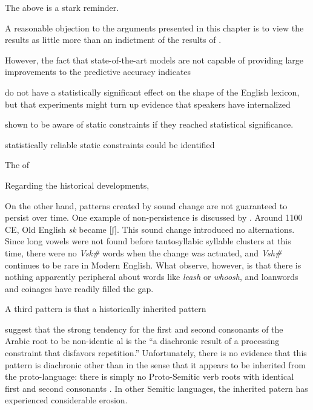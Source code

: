 
The above is a stark reminder.


A reasonable objection to the arguments presented in this chapter is to view the results as little more than an indictment of the results of \citealt{Pierrehumbert1994}.

However, the fact that state-of-the-art models are not capable of providing large improvements to the predictive accuracy indicates


 do not have a statistically significant effect on the shape of the English lexicon, but that experiments might turn up evidence that speakers have internalized 


shown to be aware of static constraints if they reached statistical significance. 



 statistically reliable static constraints could be identified 

The of



Regarding the historical developments,

\citet{Martin2007}

On the other hand, patterns created by sound change are not guaranteed to persist over time. 
One example of non-persistence is discussed by \citet{Iverson2005}.  
Around 1100 CE, Old English \emph{sk} became [ʃ]. 
This sound change introduced no alternations.
Since long vowels were not found before tautosyllabic syllable clusters at this time, there were no \emph{V\lm sk\#} words when the
 change was actuated, and \emph{V\lm sh\#} continues to be rare in Modern English. 
What \citeauthor{Iverson2005} observe, however, is that there is nothing apparently peripheral about words like \emph{leash} or \emph{whoosh}, and loanwords and coinages have readily filled the gap.

A third pattern is that a historically inherited pattern

\citet[][140]{Frisch2004} suggest that the strong tendency for the first and second consonants of the Arabic root to be non-identic
al is the ``a diachronic result of a processing constraint that disfavors repetition.'' 
Unfortunately, there is no evidence that this pattern is diachronic other than in the sense that it appears to be inherited from the proto-language: there is simply no Proto-Semitic verb roots with identical first and second consonants \citep[][178]{Greenberg1950}. 
In other Semitic languages, the inherited patern has experienced considerable erosion. 

